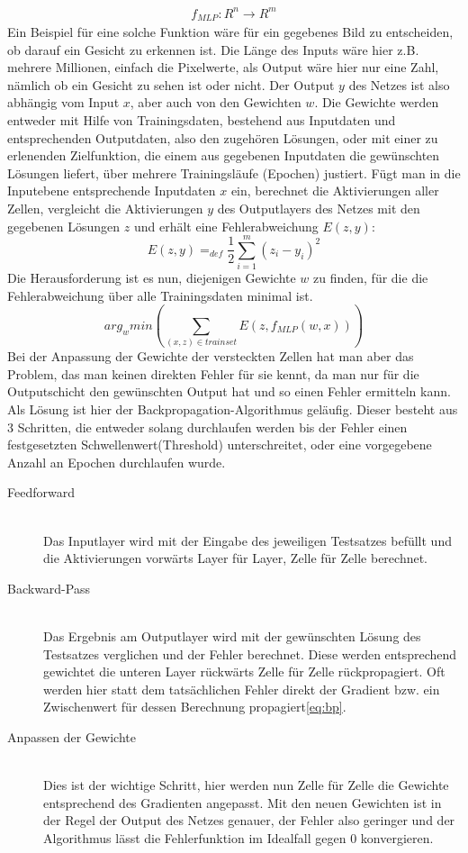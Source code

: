 \begin{gather*}
f_{MLP}: R^n \to R^m 
\end{gather*}
Ein Beispiel für eine solche Funktion wäre für ein gegebenes Bild zu entscheiden, ob darauf ein Gesicht zu erkennen ist. Die Länge des Inputs wäre hier z.B. mehrere Millionen, einfach die Pixelwerte, als Output wäre hier nur eine Zahl, nämlich ob ein Gesicht zu sehen ist oder nicht. Der Output \(y\) des Netzes ist also abhängig vom Input \(x\), aber auch von den Gewichten \(w\).
Die Gewichte werden entweder mit Hilfe von Trainingsdaten, bestehend aus Inputdaten und entsprechenden Outputdaten, also den zugehören Lösungen, oder mit einer zu erlenenden Zielfunktion, die einem aus gegebenen Inputdaten die gewünschten Lösungen liefert, über mehrere Trainingsläufe (Epochen) justiert. Fügt man in die Inputebene entsprechende Inputdaten \(x\) ein, berechnet die Aktivierungen aller Zellen, vergleicht die Aktivierungen \(y\) des Outputlayers des Netzes mit den gegebenen Lösungen \(z\) und erhält eine Fehlerabweichung \( E(z,y)\): 
\begin{equation}
E(z,y) =_{def} \dfrac{1}{2} \sum_{i=1}^{m}(z_{i}-y_{i})^{2}
	\label{eq:err}
\end{equation}
Die Herausforderung ist es nun, diejenigen Gewichte \(w\) zu finden, für die die Fehlerabweichung über alle Trainingsdaten minimal ist.
\begin{equation}
arg_{w} min( \sum_{(x,z)\in trainset} E(z,f_{MLP}(w,x)))
\label{eq:err}
\end{equation}
Bei der Anpassung der Gewichte der versteckten Zellen hat man aber das Problem, das man keinen direkten Fehler für sie kennt, da man nur für die Outputschicht den gewünschten Output hat und so einen Fehler ermitteln kann. Als Lösung ist hier der Backpropagation-Algorithmus geläufig. Dieser besteht aus 3 Schritten, die entweder solang durchlaufen werden bis der Fehler einen festgesetzten Schwellenwert(Threshold) unterschreitet, oder eine vorgegebene Anzahl an Epochen durchlaufen wurde. 
\begin{description}	\item[Feedforward]\hfill \\
	Das Inputlayer wird mit der Eingabe des jeweiligen Testsatzes befüllt und die Aktivierungen vorwärts Layer für Layer, Zelle für Zelle berechnet.  
	\item[Backward-Pass]\hfill \\ 
	Das Ergebnis am Outputlayer wird mit der gewünschten Lösung des Testsatzes verglichen und der Fehler berechnet. Diese werden entsprechend gewichtet die unteren Layer rückwärts Zelle für Zelle rückpropagiert. Oft werden hier statt dem tatsächlichen Fehler direkt der Gradient bzw. ein Zwischenwert für dessen Berechnung propagiert\ref{eq:bp}.
	\item[Anpassen der Gewichte]\hfill \\ Dies ist der wichtige Schritt, hier werden nun Zelle für Zelle die Gewichte entsprechend des Gradienten angepasst. Mit den neuen Gewichten ist in der Regel der Output des Netzes genauer, der Fehler also geringer und der Algorithmus lässt die Fehlerfunktion im Idealfall gegen 0 konvergieren.\cite{bib:nn}
\end{description}
